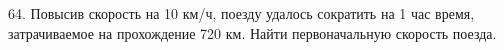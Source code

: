 64. Повысив скорость на 10 км/ч, поезду удалось сократить на 1 час время, затрачиваемое на прохождение 720 км. Найти первоначальную скорость поезда.\\
